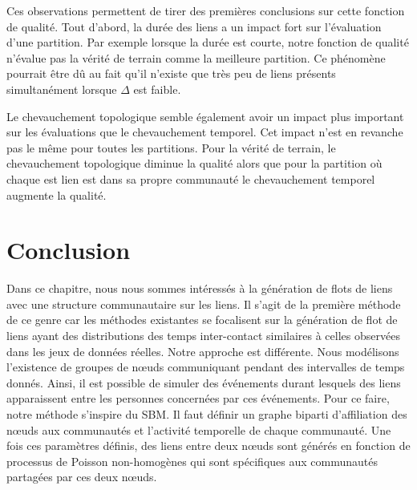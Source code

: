 Ces observations permettent de tirer des premières conclusions sur cette fonction de qualité.
Tout d'abord, la durée des liens a un impact fort sur l'évaluation d'une partition.
Par exemple lorsque la durée est courte, notre fonction de qualité n'évalue pas la vérité de terrain comme la meilleure partition.
Ce phénomène pourrait être dû au fait qu'il n'existe que très peu de liens présents simultanément lorsque $\Delta$ est faible.

Le chevauchement topologique semble également avoir un impact plus important sur les évaluations que le chevauchement temporel.
Cet impact n'est en revanche pas le même pour toutes les partitions.
Pour la vérité de terrain, le chevauchement topologique diminue la qualité alors que pour la partition où chaque est lien est dans sa propre communauté le chevauchement temporel augmente la qualité.


\section{Conclusion}

Dans ce chapitre, nous nous sommes intéressés à la génération de flots de liens avec une structure communautaire sur les liens.
Il s'agit de la première méthode de ce genre car les méthodes existantes se focalisent sur la génération de flot de liens ayant des distributions des temps inter-contact similaires à celles observées dans les jeux de données réelles.
Notre approche est différente.
Nous modélisons l'existence de groupes de n\oe uds communiquant pendant des intervalles de temps donnés.
Ainsi, il est possible de simuler des événements durant lesquels des liens apparaissent entre les personnes concernées par ces événements.
Pour ce faire, notre méthode s'inspire du SBM.
Il faut définir un graphe biparti d'affiliation des n\oe uds aux communautés et l'activité temporelle de chaque communauté.
Une fois ces paramètres définis, des liens entre deux n\oe uds sont générés en fonction de processus de Poisson non-homogènes qui sont spécifiques aux communautés partagées par ces deux n\oe uds.

